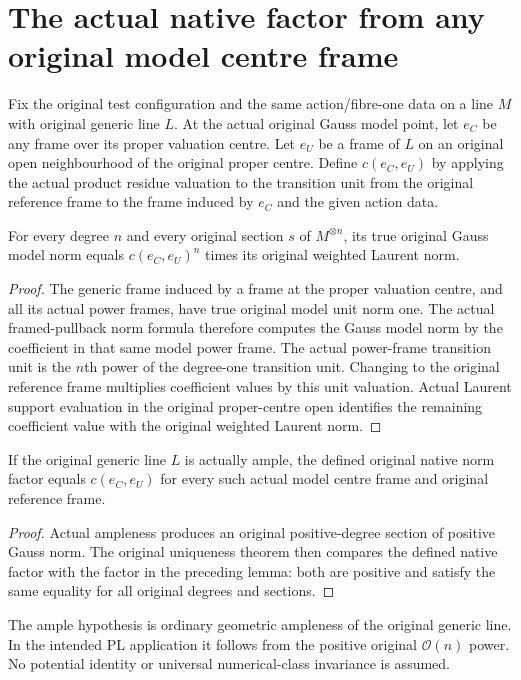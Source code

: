 \section{The actual native factor from any original model centre frame}

Fix the original test configuration and the same action/fibre-one data
on a line $M$ with original generic line $L$.  At the actual original
Gauss model point, let $e_C$ be any frame over its proper valuation centre.
Let $e_U$ be a frame of $L$ on an original open neighbourhood of the
original proper centre.  Define $c(e_C,e_U)$ by applying the actual
product residue valuation to the transition unit from the original
reference frame to the frame induced by $e_C$ and the given action data.

\begin{lemma}
\label{lem:native-tc-nef-fs-arbitrary-center-factor-spec}
\leanok
{}
For every degree $n$ and every original section $s$ of $M^{\otimes n}$,
its true original Gauss model norm equals
$c(e_C,e_U)^n$ times its original weighted Laurent norm.
\end{lemma}
\begin{proof}
The generic frame induced by a frame at the proper valuation centre,
and all its actual power frames, have true original model unit norm one.
The actual framed-pullback norm formula therefore computes the Gauss
model norm by the coefficient in that same model power frame.
The actual power-frame transition unit is the $n$th power of the
degree-one transition unit.  Changing to the original reference frame
multiplies coefficient values by this unit valuation.  Actual Laurent
support evaluation in the original proper-centre open identifies the
remaining coefficient value with the original weighted Laurent norm.
\end{proof}

\begin{lemma}
\label{lem:native-tc-nef-fs-native-factor-arbitrary-center}
\leanok
{}
If the original generic line $L$ is actually ample, the defined original
native norm factor equals $c(e_C,e_U)$ for every such actual model centre
frame and original reference frame.
\end{lemma}
\begin{proof}
Actual ampleness produces an original positive-degree section of positive
Gauss norm.  The original uniqueness theorem then compares the defined
native factor with the factor in the preceding lemma: both are positive
and satisfy the same equality for all original degrees and sections.
\end{proof}

\begin{remark}
The ample hypothesis is ordinary geometric ampleness of the original
generic line.  In the intended PL application it follows from the
positive original $\mathcal O(n)$ power.  No potential identity or
universal numerical-class invariance is assumed.
\end{remark}
